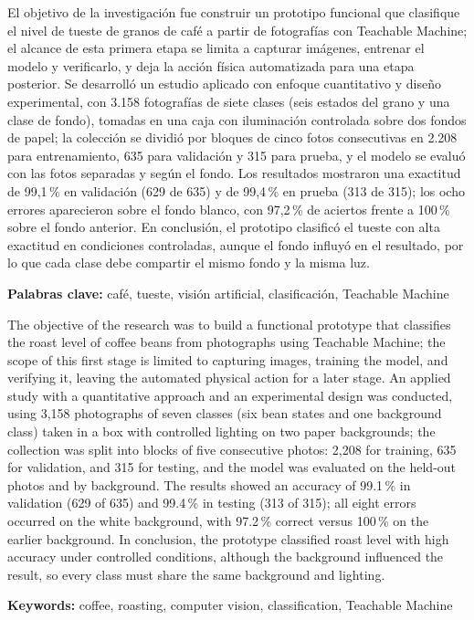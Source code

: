 \begin{absblock}
El objetivo de la investigación fue construir un prototipo funcional que clasifique el nivel de tueste de granos de café a partir de fotografías con Teachable Machine; el alcance de esta primera etapa se limita a capturar imágenes, entrenar el modelo y verificarlo, y deja la acción física automatizada para una etapa posterior. Se desarrolló un estudio aplicado con enfoque cuantitativo y diseño experimental, con 3.158 fotografías de siete clases (seis estados del grano y una clase de fondo), tomadas en una caja con iluminación controlada sobre dos fondos de papel; la colección se dividió por bloques de cinco fotos consecutivas en 2.208 para entrenamiento, 635 para validación y 315 para prueba, y el modelo se evaluó con las fotos separadas y según el fondo. Los resultados mostraron una exactitud de 99,1\,\% en validación (629 de 635) y de 99,4\,\% en prueba (313 de 315); los ocho errores aparecieron sobre el fondo blanco, con 97,2\,\% de aciertos frente a 100\,\% sobre el fondo anterior. En conclusión, el prototipo clasificó el tueste con alta exactitud en condiciones controladas, aunque el fondo influyó en el resultado, por lo que cada clase debe compartir el mismo fondo y la misma luz.

\textbf{Palabras clave:} café, tueste, visión artificial, clasificación, Teachable Machine
\end{absblock}

\begin{absblock}
The objective of the research was to build a functional prototype that classifies the roast level of coffee beans from photographs using Teachable Machine; the scope of this first stage is limited to capturing images, training the model, and verifying it, leaving the automated physical action for a later stage. An applied study with a quantitative approach and an experimental design was conducted, using 3,158 photographs of seven classes (six bean states and one background class) taken in a box with controlled lighting on two paper backgrounds; the collection was split into blocks of five consecutive photos: 2,208 for training, 635 for validation, and 315 for testing, and the model was evaluated on the held-out photos and by background. The results showed an accuracy of 99.1\,\% in validation (629 of 635) and 99.4\,\% in testing (313 of 315); all eight errors occurred on the white background, with 97.2\,\% correct versus 100\,\% on the earlier background. In conclusion, the prototype classified roast level with high accuracy under controlled conditions, although the background influenced the result, so every class must share the same background and lighting.

\textbf{Keywords:} coffee, roasting, computer vision, classification, Teachable Machine
\end{absblock}

